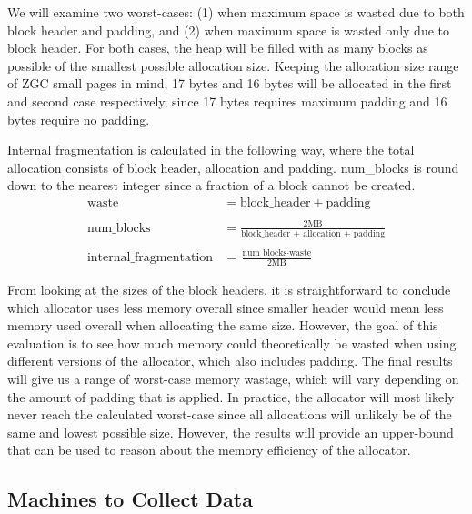 We will examine two worst-cases: (1) when maximum space is wasted due to both block header and padding, and (2) when maximum space is wasted only due to block header. For both cases, the heap will be filled with as many blocks as possible of the smallest possible allocation size. Keeping the allocation size range of ZGC small pages in mind, 17 bytes and 16 bytes will be allocated in the first and second case respectively, since 17 bytes requires maximum padding and 16 bytes require no padding.

Internal fragmentation is calculated in the following way, where the total allocation consists of block header, allocation and padding. num\_blocks is round down to the nearest integer since a fraction of a block cannot be created.
\begin{align*}
    \text{waste} &= \text{block\_header} + \text{padding} \\\\
    \text{num\_blocks} &= \frac{2\text{MB}}{\text{block\_header + allocation + padding}} \\\\
    \text{internal\_fragmentation} &= \frac{\text{num\_blocks} \cdot \text{waste}}{2\text{MB}}
\end{align*}

From looking at the sizes of the block headers, it is straightforward to conclude which allocator uses less memory overall since smaller header would mean less memory used overall when allocating the same size. However, the goal of this evaluation is to see how much memory could theoretically be wasted when using different versions of the allocator, which also includes padding. The final results will give us a range of worst-case memory wastage, which will vary depending on the amount of padding that is applied. In practice, the allocator will most likely never reach the calculated worst-case since all allocations will unlikely be of the same and lowest possible size. However, the results will provide an upper-bound that can be used to reason about the memory efficiency of the allocator.



\subsection{Machines to Collect Data}

